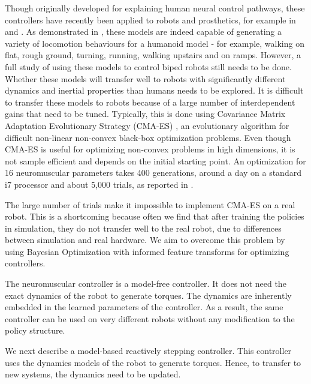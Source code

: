 Though originally developed for explaining human neural control pathways, these controllers have recently been applied to robots and prosthetics, for example in \cite{thatte} and \cite{van2015biped}. As demonstrated in \cite{song2015neural}, these models are indeed capable of generating a variety of locomotion behaviours for a humanoid model - for example, walking on flat, rough ground, turning, running, walking upstairs and on ramps. However, a full study of using these models to control biped robots still needs to be done. Whether these models will transfer well to robots with significantly different dynamics and inertial properties than humans needs to be explored. It is difficult to transfer these models to robots because of a large number of interdependent gains that need to be tuned. Typically, this is done using Covariance Matrix Adaptation Evolutionary Strategy \mbox{(CMA-ES)} \citep{hansen2006cma}, an evolutionary algorithm for difficult non-linear non-convex black-box optimization problems. Even though CMA-ES is useful for optimizing non-convex problems in high dimensions, it is not sample efficient and depends on the initial starting point. An optimization for 16 neuromuscular parameters takes 400 generations, around a day on a standard i7 processor and about 5,000 trials, as reported in \cite{song2015neural}. 

The large number of trials make it impossible to implement CMA-ES on a real robot. This is a shortcoming because often we find that after training the policies in simulation, they do not transfer well to the real robot, due to differences between simulation and real hardware. We aim to overcome this problem by using Bayesian Optimization with informed feature transforms for optimizing controllers.

The neuromuscular controller is a model-free controller. It does not need the exact dynamics of the robot to generate torques. The dynamics are inherently embedded in the learned parameters of the controller. As a result, the same controller can be used on very different robots without any modification to the policy structure. 

We next describe a model-based reactively stepping controller. This controller uses the dynamics models of the robot to generate torques. Hence, to transfer to new systems, the dynamics need to be updated.


